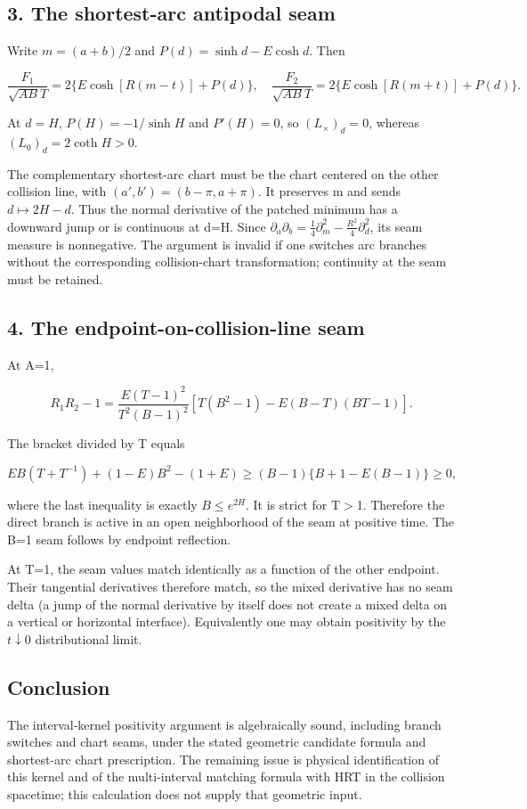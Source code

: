 \documentclass[11pt]{article}
\renewcommand{\textgreater}{\ensuremath{>}}
\begin{document}
\subsection{3. The shortest-arc antipodal
seam}\label{the-shortest-arc-antipodal-seam}

Write \(m=(a+b)/2\) and \(P(d)=\sinh d-E\cosh d\). Then

\[
\frac{F_1}{\sqrt{AB}T}=2\{E\cosh[R(m-t)]+P(d)\},
\quad
\frac{F_2}{\sqrt{AB}T}=2\{E\cosh[R(m+t)]+P(d)\}.
\]

At \(d=H\), \(P(H)=-1/\sinh H\) and \(P'(H)=0\), so \((L_\times)_d=0\),
whereas \((L_0)_d=2\coth H>0\).

The complementary shortest-arc chart must be the chart centered on the
other collision line, with \((a',b')=(b-\pi,a+\pi)\). It preserves m and
sends \(d\mapsto2H-d\). Thus the normal derivative of the patched
minimum has a downward jump or is continuous at d=H. Since
\(\partial_a\partial_b=\tfrac14\partial_m^2-\tfrac{R^2}{4}\partial_d^2\),
its seam measure is nonnegative. The argument is invalid if one switches
arc branches without the corresponding collision-chart transformation;
continuity at the seam must be retained.

\subsection{4. The endpoint-on-collision-line
seam}\label{the-endpoint-on-collision-line-seam}

At A=1,

\[
R_1R_2-1
=\frac{E(T-1)^2}{T^2(B-1)^2}
\left[T(B^2-1)-E(B-T)(BT-1)\right].
\]

The bracket divided by T equals

\[
EB(T+T^{-1})+(1-E)B^2-(1+E)
\ge(B-1)\{B+1-E(B-1)\}\ge0,
\]

where the last inequality is exactly \(B\le e^{2H}\). It is strict for
T\textgreater1. Therefore the direct branch is active in an open
neighborhood of the seam at positive time. The B=1 seam follows by
endpoint reflection.

At T=1, the seam values match identically as a function of the other
endpoint. Their tangential derivatives therefore match, so the mixed
derivative has no seam delta (a jump of the normal derivative by itself
does not create a mixed delta on a vertical or horizontal interface).
Equivalently one may obtain positivity by the \(t\downarrow0\)
distributional limit.

\subsection{Conclusion}\label{conclusion}

The interval-kernel positivity argument is algebraically sound,
including branch switches and chart seams, under the stated geometric
candidate formula and shortest-arc chart prescription. The remaining
issue is physical identification of this kernel and of the
multi-interval matching formula with HRT in the collision spacetime;
this calculation does not supply that geometric input.
\end{document}
